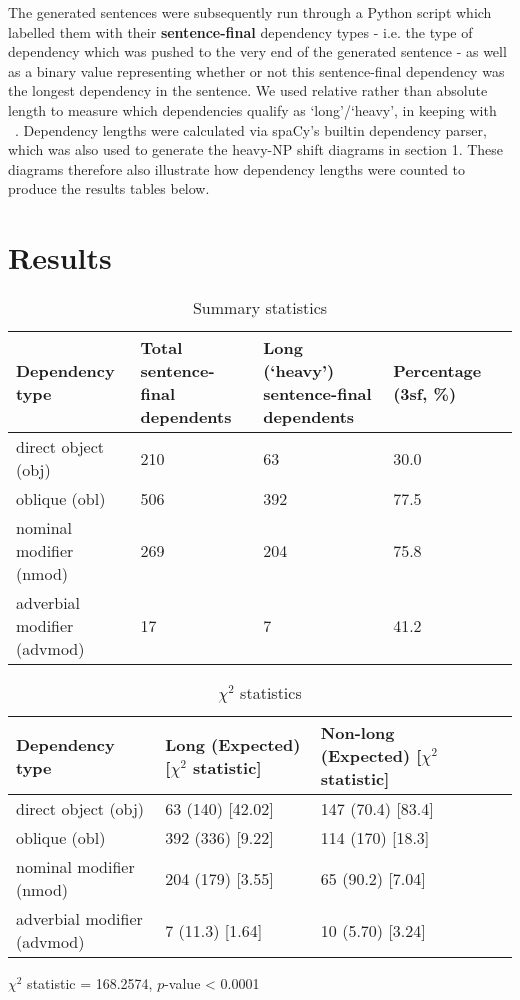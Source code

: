 \documentclass{article}
\begin{document}
The generated sentences were subsequently run through a Python script which labelled them with their \textbf{sentence-final} dependency types - i.e. the type of dependency which was pushed to the very end of the generated sentence - as well as a binary value representing whether or not this sentence-final dependency was the longest dependency in the sentence. We used relative rather than absolute length to measure which dependencies qualify as `long'/`heavy', in keeping with ~\cite{stallings2011}. Dependency lengths were calculated via spaCy's builtin dependency parser, which was also used to generate the heavy-NP shift diagrams in section 1. These diagrams therefore also illustrate how dependency lengths were counted to produce the results tables below. 

\section{Results}
\begin{table}[H]
	\caption{Summary statistics}
	\begin{adjustbox}{width=\columnwidth,center}
	\begin{tabular}{lllll}
		\toprule
		Dependency type     & Total sentence-final dependents    & Long (`heavy') sentence-final dependents   & Percentage (3sf, \%)\\
		\midrule
		direct object (obj) & 210   & 63   & 30.0 \\
		oblique (obl)   & 506   & 392   & 77.5    \\
		nominal modifier (nmod)   & 269      & 204   & 75.8     \\
		adverbial modifier (advmod)   & 17    &  7    & 41.2         \\
		\bottomrule	
	\end{tabular}
\end{adjustbox}
\end{table}

\begin{table}[H]
	\caption{$\chi^2$ statistics}
	\begin{adjustbox}{width=\columnwidth,center}
	\begin{tabular}{lllll}
		\toprule
		Dependency type     & Long (Expected) [$\chi^2$ statistic]    & Non-long (Expected)  [$\chi^2$ statistic]  \\
		\midrule
		direct object (obj) & 63  (140) [42.02] & 147  (70.4) [83.4]      \\
		oblique (obl)   & 392  (336) [9.22] & 114  (170)  [18.3]      \\
		nominal modifier (nmod)   & 204  (179) [3.55]  & 65  (90.2)  [7.04]      \\
		adverbial modifier (advmod)   & 7  (11.3) [1.64]  &  10  (5.70)  [3.24]     \\
		\bottomrule
	\end{tabular}
\end{adjustbox}
$\chi^2$ statistic = 168.2574, $p$-value < 0.0001
\end{table}
\end{document}
